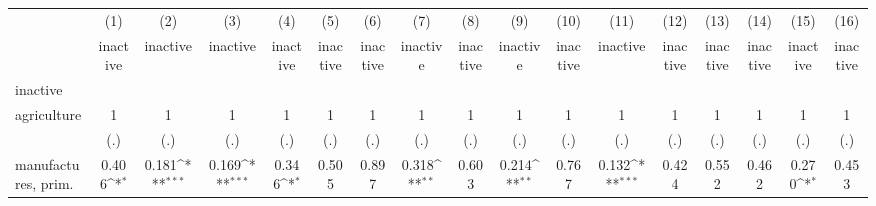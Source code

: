{
\def\sym#1{\ifmmode^{#1}\else\(^{#1}\)\fi}
\begin{tabular}{l*{16}{c}}
\hline\hline
                    &\multicolumn{1}{c}{(1)}&\multicolumn{1}{c}{(2)}&\multicolumn{1}{c}{(3)}&\multicolumn{1}{c}{(4)}&\multicolumn{1}{c}{(5)}&\multicolumn{1}{c}{(6)}&\multicolumn{1}{c}{(7)}&\multicolumn{1}{c}{(8)}&\multicolumn{1}{c}{(9)}&\multicolumn{1}{c}{(10)}&\multicolumn{1}{c}{(11)}&\multicolumn{1}{c}{(12)}&\multicolumn{1}{c}{(13)}&\multicolumn{1}{c}{(14)}&\multicolumn{1}{c}{(15)}&\multicolumn{1}{c}{(16)}\\
                    &\multicolumn{1}{c}{inactive}&\multicolumn{1}{c}{inactive}&\multicolumn{1}{c}{inactive}&\multicolumn{1}{c}{inactive}&\multicolumn{1}{c}{inactive}&\multicolumn{1}{c}{inactive}&\multicolumn{1}{c}{inactive}&\multicolumn{1}{c}{inactive}&\multicolumn{1}{c}{inactive}&\multicolumn{1}{c}{inactive}&\multicolumn{1}{c}{inactive}&\multicolumn{1}{c}{inactive}&\multicolumn{1}{c}{inactive}&\multicolumn{1}{c}{inactive}&\multicolumn{1}{c}{inactive}&\multicolumn{1}{c}{inactive}\\
\hline
inactive            &                     &                     &                     &                     &                     &                     &                     &                     &                     &                     &                     &                     &                     &                     &                     &                     \\
agriculture         &           1         &           1         &           1         &           1         &           1         &           1         &           1         &           1         &           1         &           1         &           1         &           1         &           1         &           1         &           1         &           1         \\
                    &         (.)         &         (.)         &         (.)         &         (.)         &         (.)         &         (.)         &         (.)         &         (.)         &         (.)         &         (.)         &         (.)         &         (.)         &         (.)         &         (.)         &         (.)         &         (.)         \\
[1em]
manufactures, prim. &       0.406\sym{*}  &       0.181\sym{***}&       0.169\sym{***}&       0.346\sym{*}  &       0.505         &       0.897         &       0.318\sym{**} &       0.603         &       0.214\sym{**} &       0.767         &       0.132\sym{***}&       0.424         &       0.552         &       0.462         &       0.270\sym{*}  &       0.453         \\

\end{tabular}}
